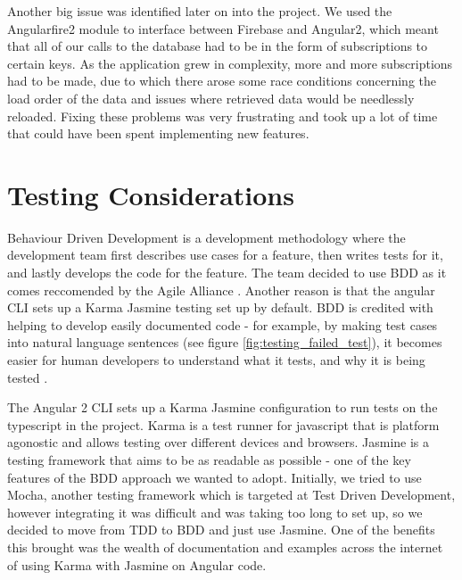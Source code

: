 \documentclass{l3proj}
\begin{document}
Another big issue was identified later on into the project. We used the
 Angularfire2 module to interface between Firebase and Angular2, which meant
 that all of our calls to the database had to be in the form of subscriptions
 to certain keys. As the application grew in complexity, more and more
 subscriptions had to be made, due to which there arose some race conditions
 concerning the load order of the data and issues where retrieved data would
 be needlessly reloaded. Fixing these problems was very frustrating and took
 up a lot of time that could have been spent implementing new features.

\section{Testing Considerations} %
\label{sec:testing}

Behaviour Driven Development is a development methodology where the development team
 first describes use cases for a feature, then writes tests for it, and lastly
 develops the code for the feature. The team decided to use BDD as it comes
 reccomended by the Agile Alliance \cite{agilealliance_bdd}. Another reason
 is that the angular CLI sets up a Karma Jasmine testing set up by default.
 BDD is credited with helping to develop easily documented code - for example,
 by making test cases into natural language sentences (see figure
 \ref{fig:testing_failed_test}), it becomes easier for human developers to
 understand what it tests, and why it is being tested \cite{north2006bdd}.

 

The Angular 2 CLI sets up a Karma Jasmine configuration to run tests on
 the typescript in the project. Karma is a test runner for javascript
 that is platform agonostic and allows testing over different devices
 and browsers\cite{jina2013javascript}. Jasmine is a testing framework
 that aims to be as readable as possible - one of the key features of
 the BDD approach we wanted to adopt. Initially, we tried to use Mocha,
 another testing framework which is targeted at Test Driven Development,
 however integrating it was difficult and was taking too long to set up,
 so we decided to move from TDD to BDD and just use Jasmine. One of the
 benefits this brought was the wealth of documentation and examples
 across the internet of using Karma with Jasmine on Angular code.
\end{document}
